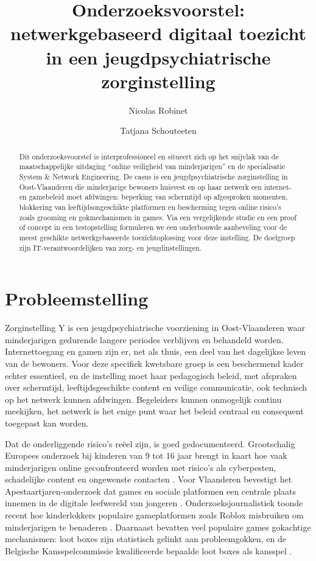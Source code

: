 \documentclass{hogent-article}
\title{Onderzoeksvoorstel: netwerkgebaseerd digitaal toezicht in een jeugdpsychiatrische zorginstelling}
\author{Nicolas Robinet} \email{nicolas.robinet@student.hogent.be}
\author{Tatjana Schouteeten} \email{tatjana.schouteeten@student.hogent.be}
\begin{document}
\begin{abstract}
    Dit onderzoeksvoorstel is interprofessioneel en situeert zich op het snijvlak van de maatschappelijke uitdaging ``online veiligheid van minderjarigen'' en de specialisatie System \& Network Engineering. De casus is een jeugdpsychiatrische zorginstelling in Oost-Vlaanderen die minderjarige bewoners huisvest en op haar netwerk een internet- en gamebeleid moet afdwingen: beperking van schermtijd op afgesproken momenten, blokkering van leeftijdsongeschikte platformen en bescherming tegen online risico's zoals grooming en gokmechanismen in games. Via een vergelijkende studie en een proof of concept in een testopstelling formuleren we een onderbouwde aanbeveling voor de meest geschikte netwerkgebaseerde toezichtoplossing voor deze instelling. De doelgroep zijn IT-verantwoordelijken van zorg- en jeugdinstellingen.
\end{abstract}

\tableofcontents

\section{Probleemstelling}
Zorginstelling Y is een jeugdpsychiatrische voorziening in Oost-Vlaanderen waar minderjarigen gedurende langere periodes verblijven en behandeld worden. Internettoegang en gamen zijn er, net als thuis, een deel van het dagelijkse leven van de bewoners. Voor deze specifiek kwetsbare groep is een beschermend kader echter essentieel, en de instelling moet haar pedagogisch beleid, met afspraken over schermtijd, leeftijdsgeschikte content en veilige communicatie, ook technisch op het netwerk kunnen afdwingen. Begeleiders kunnen onmogelijk continu meekijken, het netwerk is het enige punt waar het beleid centraal en consequent toegepast kan worden.

Dat de onderliggende risico's reëel zijn, is goed gedocumenteerd. Grootschalig Europees onderzoek bij kinderen van 9 tot 16 jaar brengt in kaart hoe vaak minderjarigen online geconfronteerd worden met risico's als cyberpesten, schadelijke content en ongewenste contacten \autocite{Smahel2020}. Voor Vlaanderen bevestigt het Apestaartjaren-onderzoek dat games en sociale platformen een centrale plaats innemen in de digitale leefwereld van jongeren \autocite{Mediawijs2024}. Onderzoeksjournalistiek toonde recent hoe kinderlokkers populaire gameplatformen zoals Roblox misbruiken om minderjarigen te benaderen \autocite{CarvilleChen2024}. Daarnaast bevatten veel populaire games gokachtige mechanismen: loot boxes zijn statistisch gelinkt aan probleemgokken, en de Belgische Kansspelcommissie kwalificeerde bepaalde loot boxes als kansspel \autocite{ZendleCairns2018, Kansspelcommissie2018}.
\end{document}
